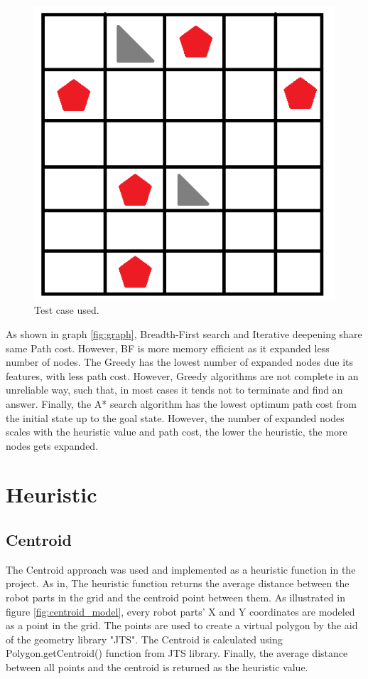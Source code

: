 \begin{figure}[H] 
   	\centering
	\includegraphics[scale=0.6]{images/grid} 
    \caption{Test case used.}
    \label{fig:grid} 
\end{figure}

As shown in graph \ref{fig:graph}, Breadth-First search and Iterative deepening share same Path cost. However, BF is more memory efficient as it expanded less number of nodes. The Greedy has the lowest number of expanded nodes due its features, with less path cost. However, Greedy algorithms are not complete in an unreliable way, such that, in most cases it tends not to terminate and find an answer. Finally, the A* search algorithm has the lowest optimum path cost from the initial state up to the goal state. However, the number of expanded nodes scales with the heuristic value and path cost, the lower the heuristic, the more nodes gets expanded.



\chapter{Heuristic}
\section{Centroid}

The Centroid approach was used and implemented as a heuristic function in the project. As in, The heuristic function returns the average distance between the robot parts in the grid and the centroid point between them. As illustrated in figure \ref{fig:centroid_model}, every robot parts' X and Y coordinates are modeled as a point in the grid. The points are used to create a virtual polygon by the aid of the geometry library "JTS". The Centroid is calculated using Polygon.getCentroid() function from JTS library. Finally, the average distance between all points and the centroid is returned as the heuristic value.

